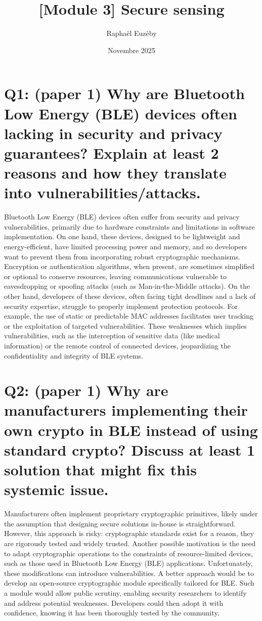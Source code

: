 \documentclass{article}
\title{[Module 3] Secure sensing}
\author{Raphaël Euzèby}
\date{Novembre 2025}
\begin{document}
\maketitle


\section*{
Q1: (paper 1) Why are Bluetooth Low Energy (BLE) devices often lacking in security and privacy guarantees? Explain at least 2 reasons and how they translate into vulnerabilities/attacks.
}

Bluetooth Low Energy (BLE) devices often suffer from security and privacy vulnerabilities, primarily due to hardware constraints and limitations in software implementation. On one hand, these devices, designed to be lightweight and energy-efficient, have limited processing power and memory, and so developers want to prevent them from incorporating robust cryptographic mechanisms. Encryption or authentication algorithms, when present, are sometimes simplified or optional to conserve resources, leaving communications vulnerable to eavesdropping or spoofing attacks (such as Man-in-the-Middle attacks). On the other hand, developers of these devices, often facing tight deadlines and a lack of security expertise, struggle to properly implement protection protocols. For example, the use of static or predictable MAC addresses facilitates user tracking or the exploitation of targeted vulnerabilities. These weaknesses which implies vulnerabilities, such as the interception of sensitive data (like medical information) or the remote control of connected devices, jeopardizing the confidentiality and integrity of BLE systems.

\section*{
Q2: (paper 1) Why are manufacturers implementing their own crypto in BLE instead of using standard crypto? Discuss at least 1 solution that might fix this systemic issue.
}

Manufacturers often implement proprietary cryptographic primitives, likely under the assumption that designing secure solutions in-house is straightforward. However, this approach is risky: cryptographic standards exist for a reason, they are rigorously tested and widely trusted. Another possible motivation is the need to adapt cryptographic operations to the constraints of resource-limited devices, such as those used in Bluetooth Low Energy (BLE) applications. Unfortunately, these modifications can introduce vulnerabilities.
A better approach would be to develop an open-source cryptographic module specifically tailored for BLE. Such a module would allow public scrutiny, enabling security researchers to identify and address potential weaknesses. Developers could then adopt it with confidence, knowing it has been thoroughly tested by the community.
\end{document}
